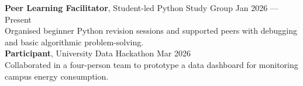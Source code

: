 \textbf{Peer Learning Facilitator}, Student-led Python Study Group \hfill Jan 2026 --- Present\\
Organised beginner Python revision sessions and supported peers with debugging and basic algorithmic problem-solving.\\[0.2em]
\textbf{Participant}, University Data Hackathon \hfill Mar 2026\\
Collaborated in a four-person team to prototype a data dashboard for monitoring campus energy consumption.
